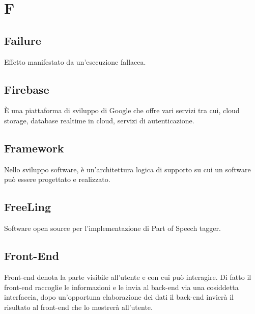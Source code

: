 \section*{F}

\subsection{Failure}
Effetto manifestato da un'esecuzione fallacea.

\subsection{Firebase}
È una piattaforma di sviluppo di Google che offre vari servizi tra cui, cloud storage, database realtime in cloud, servizi di autenticazione.

\subsection{Framework}
Nello sviluppo software, è un'architettura logica di supporto su cui un software può essere progettato e realizzato.

\subsection{FreeLing}
Software open source per l'implementazione di Part of Speech tagger.

\subsection{Front-End}
Front-end denota la parte visibile all'utente e con cui può interagire. Di fatto il front-end raccoglie le informazioni e le invia al back-end via una cosiddetta interfaccia, dopo un'opportuna elaborazione dei dati il back-end invierà il risultato al front-end che lo mostrerà all'utente. 